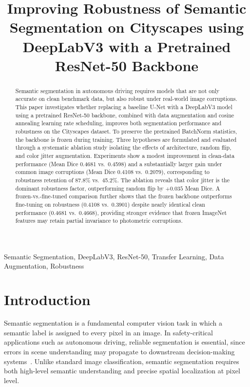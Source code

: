 \documentclass[conference]{IEEEtran}
\begin{document}
\title{Improving Robustness of Semantic Segmentation on Cityscapes using DeepLabV3 with a Pretrained ResNet-50 Backbone}

\author{
}

\maketitle

\begin{abstract}
Semantic segmentation in autonomous driving requires models that are not only accurate on clean benchmark data, but also robust under real-world image corruptions. This paper investigates whether replacing a baseline U-Net with a DeepLabV3 model using a pretrained ResNet-50 backbone, combined with data augmentation and cosine annealing learning rate scheduling, improves both segmentation performance and robustness on the Cityscapes dataset. To preserve the pretrained BatchNorm statistics, the backbone is frozen during training. Three hypotheses are formulated and evaluated through a systematic ablation study isolating the effects of architecture, random flip, and color jitter augmentation. Experiments show a modest improvement in clean-data performance (Mean Dice 0.4681 vs.\ 0.4598) and a substantially larger gain under common image corruptions (Mean Dice 0.4108 vs.\ 0.2079), corresponding to robustness retention of 87.8\% vs.\ 45.2\%. The ablation reveals that color jitter is the dominant robustness factor, outperforming random flip by $+0.035$ Mean Dice. A frozen-vs.-fine-tuned comparison further shows that the frozen backbone outperforms fine-tuning on robustness (0.4108 vs.\ 0.3901) despite nearly identical clean performance (0.4681 vs.\ 0.4668), providing stronger evidence that frozen ImageNet features may retain partial invariance to photometric corruptions.
\end{abstract}

\begin{IEEEkeywords}
Semantic Segmentation, DeepLabV3, ResNet-50, Transfer Learning, Data Augmentation, Robustness
\end{IEEEkeywords}

\section{Introduction}

Semantic segmentation is a fundamental computer vision task in which a semantic label is assigned to every pixel in an image. In safety-critical applications such as autonomous driving, reliable segmentation is essential, since errors in scene understanding may propagate to downstream decision-making systems~\cite{grigorescu2020survey}. Unlike standard image classification, semantic segmentation requires both high-level semantic understanding and precise spatial localization at pixel level.
\end{document}
